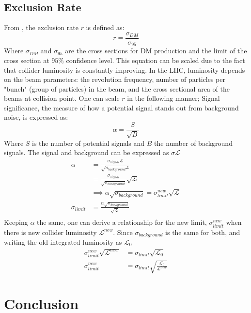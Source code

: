 \documentclass[12pt]{article}
\begin{document}
\subsection{Exclusion Rate}
From \cite{Aruhrib2012Inert}, the exclusion rate $r$ is defined as:
\begin{equation}
    r = \frac{\sigma_{DM}}{\sigma_{95}}
\end{equation}
Where $\sigma_{DM}$ and $\sigma_{95}$ are the cross sections for DM production and the limit of the cross section at $95\%$ confidence level. This equation can be scaled due to the fact that collider luminosity is constantly improving. In the LHC, luminosity depends on the beam parameters: the revolution frequency, number of particles per "bunch" (group of particles) in the beam, and the cross sectional area of the beams at collision point. One can scale $r$ in the following manner;
Signal significance, the measure of how a potential signal stands out from background noise, is expressed as:
\begin{equation}
    \alpha = \frac{S}{\sqrt{B}}
\end{equation}
Where $S$ is the number of potential signals and $B$ the number of background signals. The signal and background can be expressed as $\sigma \mathcal{L}$
\begin{equation}
    \begin{split}
        \alpha &= \frac{\sigma_{signal} \mathcal{L}}{\sqrt{\sigma_{background }\mathcal{L}}}
        \\&= \frac{\sigma_{signal}}{\sqrt{\sigma_{background}}} \sqrt{\mathcal{L}}
        \\&\implies \alpha \sqrt{\sigma_{background}} = \sigma_{limit}^{new}\sqrt{\mathcal{L}}
        \\\sigma_{limit} &=\frac{\alpha \sqrt{\sigma_{background}}}{\sqrt{\mathcal{L}}}  
        \\
    \end{split}
\end{equation}
Keeping $\alpha$ the same, one can derive a relationship for the new limit, $\sigma_{limit}^{new}$ when there is new collider luminosity $\mathcal{L}^{new}$. Since $\sigma_{background}$ is the same for both, and writing the old integrated luminosity as $\mathcal{L}_0$ 
\begin{equation}
    \begin{split}
    \sigma_{limit}^{new} \sqrt{\mathcal{L}^{new}} &= \sigma_{limit}\sqrt{\mathcal{L}_0}
        \\ \sigma_{limit}^{new}&= \sigma_{limit}\sqrt{\frac{\mathcal{L}_0}{\mathcal{L}^{new}}}
    \end{split}
\end{equation}

\section{Conclusion}
\label{sec:conclusion}

\onecolumn
\newpage


\end{document}
